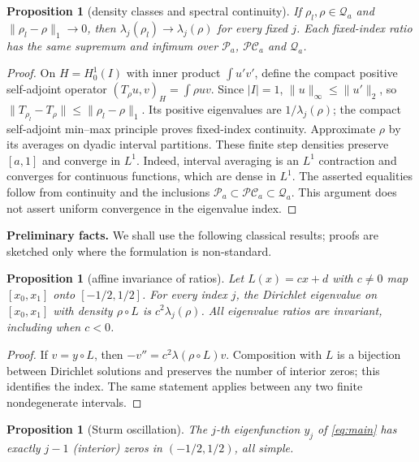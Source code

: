 ﻿\documentclass[11pt]{article}
\newtheorem{proposition}[theorem]{Proposition}
\begin{document}
\begin{proposition}[density classes and spectral continuity]\label{prop:density}
 If $\rho_l,\rho\in\mathcal Q_a$ and $\|\rho_l-\rho\|_1\to0$, then
 $\lambda_j(\rho_l)\to\lambda_j(\rho)$ for every fixed $j$.
 Each fixed-index ratio has the same supremum and infimum over
 $\mathcal P_a$, $\mathcal{PC}_a$ and $\mathcal Q_a$.
\end{proposition}

\begin{proof}
 On $H=H^1_0(I)$ with inner product $\int u'v'$, define the compact
 positive self-adjoint operator $(T_\rho u,v)_H=\int\rho uv$.
 Since $|I|=1$, $\|u\|_\infty\le\|u'\|_2$, so
 $\|T_{\rho_l}-T_\rho\|\le\|\rho_l-\rho\|_1$.
 Its positive eigenvalues are $1/\lambda_j(\rho)$; the compact
 self-adjoint min--max principle proves fixed-index continuity.
 Approximate $\rho$ by its averages on dyadic interval partitions.
 These finite step densities preserve $[a,1]$ and converge in $L^1$.
 Indeed, interval averaging is an $L^1$ contraction and converges for
 continuous functions, which are dense in $L^1$.
 The asserted equalities follow from continuity and the inclusions
 $\mathcal P_a\subset\mathcal{PC}_a\subset\mathcal Q_a$.
 This argument does not assert uniform convergence in the eigenvalue index.
\end{proof}

\medskip
\noindent\textbf{Preliminary facts.}  We shall use the following classical
results; proofs are sketched only where the formulation is non-standard.

\begin{proposition}[affine invariance of ratios]\label{prop:affine}
	Let $L(x)=cx+d$ with $c\neq 0$ map $[x_0,x_1]$ onto $[-1/2,1/2]$.
 For every index $j$, the Dirichlet eigenvalue on $[x_0,x_1]$ with
 density $\rho\circ L$ is $c^2\lambda_j(\rho)$.
 All eigenvalue ratios are invariant, including when $c<0$.
\end{proposition}

\begin{proof}
 If $v=y\circ L$, then $-v''=c^2\lambda(\rho\circ L)v$.
 Composition with $L$ is a bijection between Dirichlet solutions and
 preserves the number of interior zeros; this identifies the index.
 The same statement applies between any two finite nondegenerate intervals.
\end{proof}

\begin{proposition}[Sturm oscillation]\label{prop:osc}
	The $j$-th eigenfunction $y_j$ of \eqref{eq:main} has exactly $j-1$
	(interior) zeros in $(-1/2,1/2)$, all simple.
\end{proposition}
\end{document}
